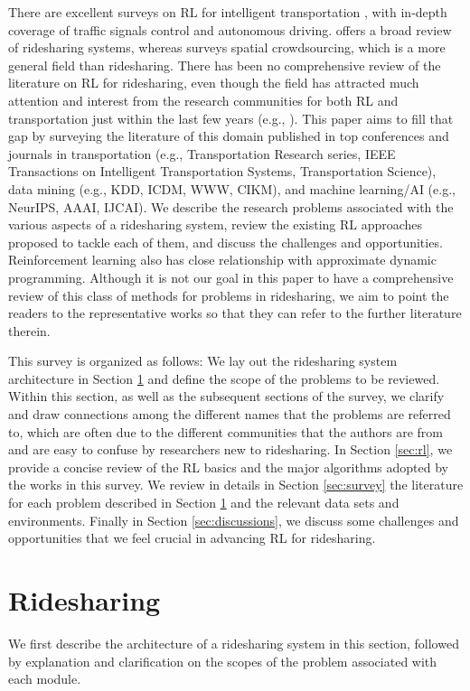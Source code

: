 \documentclass{article}
\begin{document}
There are excellent surveys on RL for intelligent transportation \citep{haydari2020survey,yau2017tscsurvey}, with in-depth coverage of traffic signals control and autonomous driving. \citep{wang2019ridesourcing} offers a broad review of ridesharing systems, whereas \cite{tong2020spatial} surveys spatial crowdsourcing, which is a more general field than ridesharing.  There has been no comprehensive review of the literature on RL for ridesharing, even though the field has attracted much attention and interest from the research communities for both RL and transportation just within the last few years (e.g., \citep{shah2020neural,tang2019deep,al2020approximate,shou2020reward}). This paper aims to fill that gap by surveying the literature of this domain published in top conferences and journals in transportation (e.g., Transportation Research series, IEEE Transactions on Intelligent Transportation Systems, Transportation Science), data mining (e.g., KDD, ICDM, WWW, CIKM), and machine learning/AI (e.g., NeurIPS, AAAI, IJCAI). We describe the research problems associated with the various aspects of a ridesharing system, review the existing RL approaches proposed to tackle each of them, and discuss the challenges and opportunities. 
Reinforcement learning also has close relationship with approximate dynamic programming. Although it is not our goal in this paper to have a comprehensive review of this class of  methods for problems in ridesharing, we aim to point the readers to the representative works so that they can refer to the further literature therein.

This survey is organized as follows: We lay out the ridesharing system architecture in Section \ref{sec:rideshare} and define the scope of the problems to be reviewed. Within this section, as well as the subsequent sections of the survey, we clarify and draw connections among the different names that the problems are referred to, which are often due to the different communities that the authors are from and are easy to confuse by researchers new to ridesharing. In Section \ref{sec:rl}, we provide a concise review of the RL basics and the major algorithms adopted by the works in this survey. We review in details in Section \ref{sec:survey} the literature for each problem described in Section \ref{sec:rideshare} and the relevant data sets and environments. Finally in Section \ref{sec:discussions}, we discuss some challenges and opportunities that we feel crucial in advancing RL for ridesharing.

\section{Ridesharing}\label{sec:rideshare}
We first describe the architecture of a ridesharing system in this section, followed by explanation and clarification on the scopes of the problem associated with each module.
\end{document}
